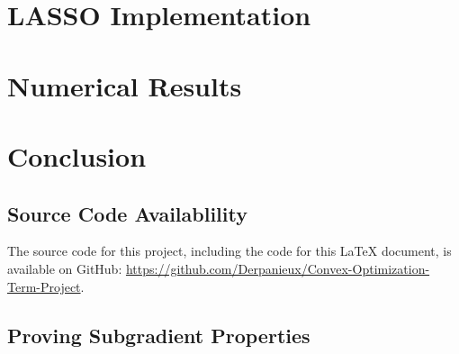 \documentclass[journal,onecolumn]{IEEEtran}
\begin{document}
\section{LASSO Implementation}\label{sec:lasso}

\section{Numerical Results}\label{sec:results}

\section{Conclusion}\label{sec:conclusion}

\appendix
\subsection{Source Code Availablility}\label{sec:github}
The source code for this project, including the code for this \LaTeX{ }document, is available on GitHub: \url{https://github.com/Derpanieux/Convex-Optimization-Term-Project}.
\subsection{Proving Subgradient Properties}\label{sec:subgradient properties proofs}
\end{document}
